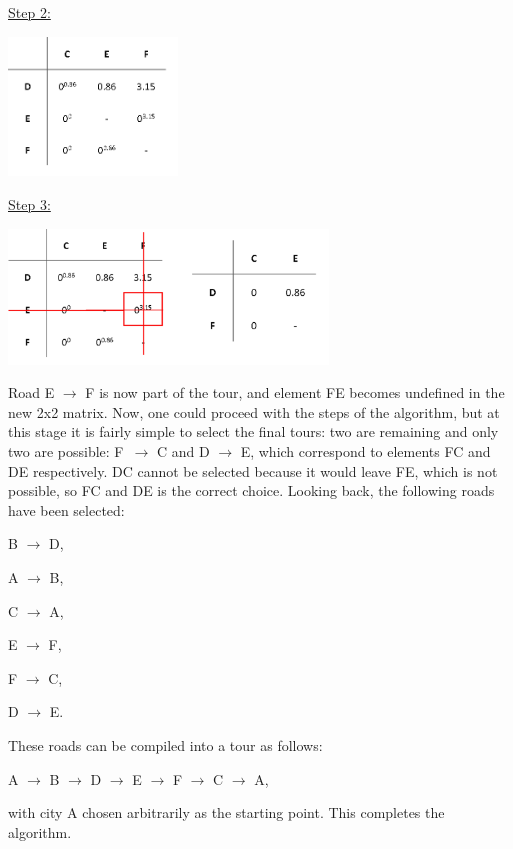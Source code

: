 \underline{Step 2:} 
\vspace{-3mm}
\begin{center}
	\includegraphics[height=3.7cm]{4pen}
\end{center}	


\underline{Step 3:}
\vspace{-2mm}
\begin{center}
	\includegraphics[height=3.6cm]{4elim5}
\end{center}

\noindent
Road E $\rightarrow$ F is now part of the tour, and element FE becomes undefined in the new 2x2 matrix. Now, one could proceed with the steps of the algorithm, but at this stage it is fairly simple to select the final tours: two are remaining and only two are possible: F~$\rightarrow$ C and D $\rightarrow$ E, which correspond to elements FC and DE respectively. DC cannot be selected because it would leave FE, which is not possible, so FC and DE is the correct choice.
Looking back, the following roads have been selected:
\begin{center}
	\par B $\rightarrow$ D, 
	\par A $\rightarrow$ B, 
	\par C $\rightarrow$ A, 
	\par E $\rightarrow$ F,
	\par F $\rightarrow$ C, 
	\par D $\rightarrow$ E.
\end{center}

\noindent
These roads can be compiled into a tour as follows:
\begin{center}
	A $\rightarrow$ B $\rightarrow$ D $\rightarrow$ E $\rightarrow$ F $\rightarrow$ C $\rightarrow$ A,
\end{center}
with city A chosen arbitrarily as the starting point. This completes the algorithm. 